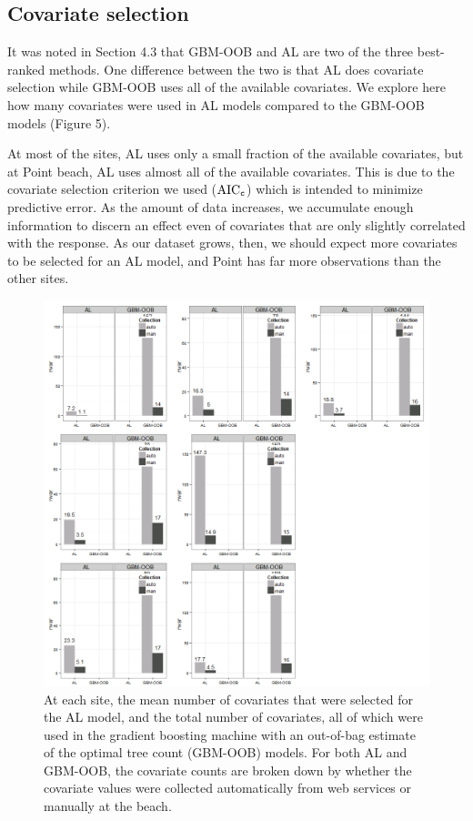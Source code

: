 \subsection{Covariate selection}\label{covariate-selection}

It was noted in Section 4.3 that GBM-OOB and AL are two of the three
best-ranked methods. One difference between the two is that AL does
covariate selection while GBM-OOB uses all of the available covariates.
We explore here how many covariates were used in AL models compared to
the GBM-OOB models (Figure 5).

At most of the sites, AL uses only a small fraction of the available
covariates, but at Point beach, AL uses almost all of the available
covariates. This is due to the covariate selection criterion we used
(\(\text{AIC}_{\tt c}\)) which is intended to minimize predictive error.
As the amount of data increases, we accumulate enough information to
discern an effect even of covariates that are only slightly correlated
with the response. As our dataset grows, then, we should expect more
covariates to be selected for an AL model, and Point has far more
observations than the other sites.

\begin{figure}[htbp]
\centering
\includegraphics{figure/varselect-barchart.png}
\caption{At each site, the mean number of covariates that were selected
for the AL model, and the total number of covariates, all of which were
used in the gradient boosting machine with an out-of-bag estimate of the
optimal tree count (GBM-OOB) models. For both AL and GBM-OOB, the
covariate counts are broken down by whether the covariate values were
collected automatically from web services or manually at the beach.}
\end{figure}

